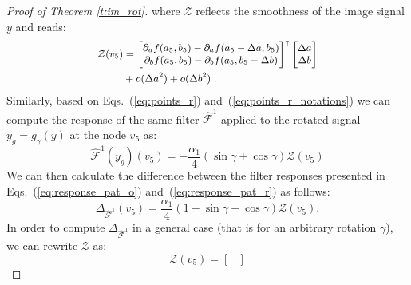 \documentclass[10pt,journal,compsoc]{IEEEtran}
\newcommand{\hmF}{\hat{\mathcal{F}}}
\begin{document}
\begin{proof}[Proof of Theorem \ref{t:im_rot}]
		
		\noindent
		where $\mathcal{Z}$ reflects the smoothness of the image signal $y$ and reads:
		\begin{equation}
		\small
		\begin{aligned}
		\mathcal{Z}(v_5) & =
		\begin{bmatrix}
		\partial_a f (a_5, b_5)  - \partial_a f (a_5-\Delta a, b_5)\\
		\partial_b f (a_5,b_5)  - \partial_b f (a_5,b_5-\Delta b)\\
		\end{bmatrix}^{\intercal}
		\begin{bmatrix}
		\Delta a \\
		\Delta b \\
		\end{bmatrix} \\
		 & + o(\Delta a^2) + o(\Delta b^2)\;.
		\end{aligned}
		\end{equation}
		\noindent
		Similarly, based on Eqs.~(\ref{eq:points_r}) and~(\ref{eq:points_r_notations}) we can compute the response of the same filter $\hmF^1$ applied to the rotated signal $y_g = g_{\gamma}(y)$ at the node $v_5$ as:
		\begin{equation}
		\hmF^{1}(y_g)(v_5) = - \frac{\alpha_1}{4} (\sin\gamma + \cos\gamma) \mathcal{Z}(v_5)
		\label{eq:response_pat_r}
		\end{equation}
		\noindent
		We can then calculate the difference between the filter responses presented in Eqs.~(\ref{eq:response_pat_o}) and~(\ref{eq:response_pat_r}) as follows:
		\begin{equation}
		\Delta_{\hmF^1}(v_5) = \frac{\alpha_1}{4} (1 - \sin\gamma - \cos\gamma) \mathcal{Z}(v_5).
		\label{eq:diff_resp}
		\end{equation} 
		In order to compute $\Delta_{\hmF^1}$ in a general case (that is for an arbitrary rotation $\gamma$), we can rewrite $\mathcal{Z}$ as:
		\begin{equation}
		\mathcal{Z}(v_5) =
		\begin{bmatrix}

\end{bmatrix}
\end{equation}
\end{proof}
\end{document}

